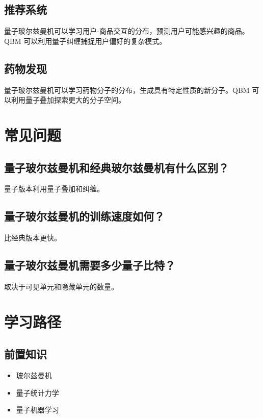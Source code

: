 \documentclass[12pt,a4paper]{article}
\begin{document}
\subsection{推荐系统}

量子玻尔兹曼机可以学习用户-商品交互的分布，预测用户可能感兴趣的商品。QBM 可以利用量子纠缠捕捉用户偏好的复杂模式。

\subsection{药物发现}

量子玻尔兹曼机可以学习药物分子的分布，生成具有特定性质的新分子。QBM 可以利用量子叠加探索更大的分子空间。

\section{常见问题}

\subsection{量子玻尔兹曼机和经典玻尔兹曼机有什么区别？}

量子版本利用量子叠加和纠缠。

\subsection{量子玻尔兹曼机的训练速度如何？}

比经典版本更快。

\subsection{量子玻尔兹曼机需要多少量子比特？}

取决于可见单元和隐藏单元的数量。

\section{学习路径}

\subsection{前置知识}
\begin{itemize}
  \item 玻尔兹曼机
  \item 量子统计力学
  \item 量子机器学习
\end{itemize}
\end{document}
